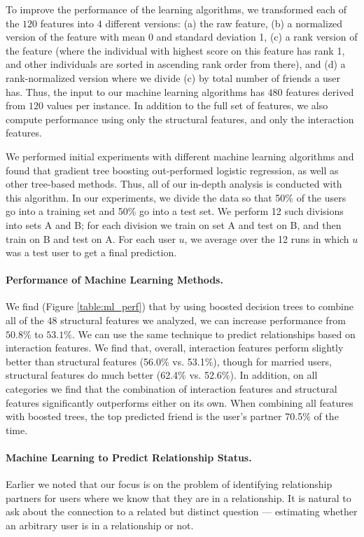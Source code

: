 \documentclass{sigchi}
\newcommand{\xhdr}[1]{\paragraph*{\bf #1.}}
\begin{document}
To improve
the performance of the learning algorithms, we transformed each of the $120$
features into $4$ different versions: (a) the raw feature, (b) a normalized
version of the feature with mean 0 and standard deviation 1, 
(c) a rank version of
the feature (where the 
individual with highest score on this feature has rank 1, 
and other individuals are sorted in ascending rank order from there),
and (d) a rank-normalized version where we divide (c) by total number of
friends a user has.  Thus, the input to our machine learning algorithms has
$480$ features derived from $120$ values per instance.
In addition to the full set of features, we also compute performance 
using only the structural features, and only the interaction features.

We performed initial experiments with different machine learning algorithms
and found that gradient tree boosting
\cite{friedman-gradient-boosting}
out-performed logistic regression, as
well as other tree-based methods.  Thus, all of our in-depth analysis is
conducted with this algorithm.
In our experiments, we divide the data so that 50\% of the users go into
a training set and 50\% go into a test set.  We perform 12 such
divisions into sets A and B; for each division we train on set A
and test on B, and then train on B and test on A.  
For each user $u$, we average
over the 12 runs in which $u$ was a test user to get a final prediction.

\xhdr{Performance of Machine Learning Methods}
We find (Figure
\ref{table:ml_perf}) that by using boosted decision trees to combine all of the
$48$ structural features we analyzed, we can increase performance from
$50.8\%$ to $53.1\%$.  
We can use the same technique to predict relationships
based on interaction features.  We find that, overall, interaction
features perform slightly better than structural features (56.0\% vs. 53.1\%),
though for married users, structural features do much 
better (62.4\% vs. 52.6\%).  
In addition, on all categories we find that the combination of
interaction features and structural features significantly outperforms either
on its own.  When combining all features with boosted trees, the top
predicted friend is the user's partner 70.5\% of the time.


\xhdr{Machine Learning to Predict Relationship Status}
Earlier we noted that our focus is on the problem of identifying
relationship partners for users where we know that they are in
a relationship.
It is natural to ask about the connection to a related but distinct
question --- estimating whether an arbitrary user is in a relationship or not.
\end{document}
